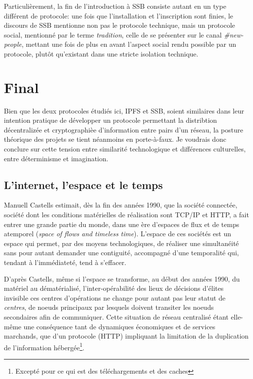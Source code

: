 \documentclass{article}
\begin{document}
Particulièrement, la fin de l'introduction à SSB consiste autant en un type différent de protocole: une fois que l'installation et l'inscription sont finies, le discours de SSB mentionne non pas le protocole technique, mais un protocole social, mentionné par le terme \emph{tradition}, celle de se présenter sur le canal \emph{\#new-people}, mettant une fois de plus en avant l'aspect social rendu possible par un protocole, plutôt qu'existant dans une stricte isolation technique.

\section{Final}

Bien que les deux protocoles étudiés ici, IPFS et SSB, soient similaires dans leur intention pratique de développer un protocole permettant la distribtion décentralizée et cryptographièe d'information entre pairs d'un réseau, la posture théorique des projets se tient néanmoins en porte-à-faux. Je voudrais donc conclure sur cette tension entre similarité technologique et différences culturelles, entre déterminisme et imagination.

\subsection{L'internet, l'espace et le temps}

Manuell Castells estimait, dès la fin des années 1990, que la société connectée, société dont les conditions matérielles de réalisation sont TCP/IP et HTTP, a fait entrer une grande partie du monde, dans une ère d'espaces de flux et de temps atemporel (\emph{space of flows and timeless time})\cite{castells_communication_2009}. L'espace de ces sociétés est un espace qui permet, par des moyens technologiques, de réaliser une simultanéité sans pour autant demander une contiguité, accompagné d'une temporalité qui, tendant à l'immédiateté, tend à s'effacer\cite{virilio_speed_2006}.

D'après Castells, même si l'espace se transforme, au début des années 1990, du matériel au dématérialisé, l'inter-opérabilité des lieux de décisions d'élites invisible ces centres d'opérations ne change pour autant pas leur statut de \emph{centres}, de noeuds principaux par lesquels doivent transiter les noeuds secondaires afin de communiquer. Cette situation de réseau centralisé étant elle-même une conséquence tant de dynamiques économiques et de services marchands, que d'un protocole (HTTP) impliquant la limitation de la duplication de l'information hébergée\footnote{Excepté pour ce qui est des téléchargements et des caches}.
\end{document}
